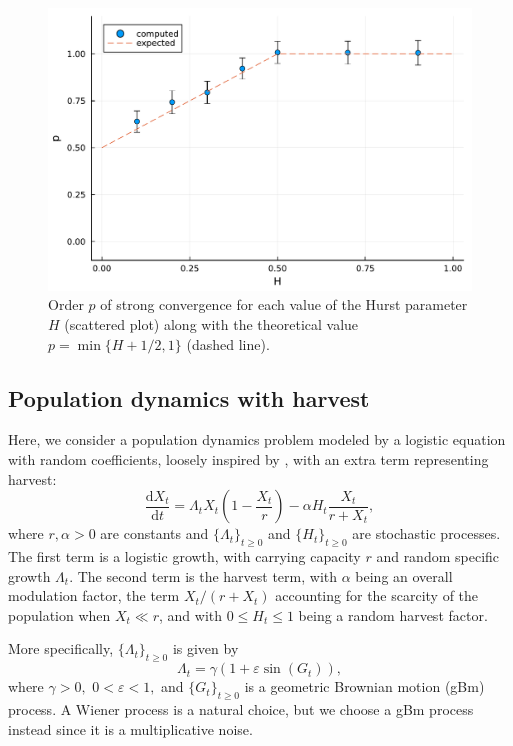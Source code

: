 \documentclass[reqno,12pt]{amsart}
\theoremstyle{plain} %
\theoremstyle{definition} %
\begin{document}
\begin{figure}[htb]
    \includegraphics[scale=0.6]{img/order_dep_on_H_fBm.pdf}
    \caption{Order $p$ of strong convergence for each value of the Hurst parameter $H$ (scattered plot) along with the theoretical value $p=\min\{H + 1/2, 1\}$ (dashed line).}
    \label{figorderdepHfBm}
\end{figure}

\subsection{Population dynamics with harvest}
\label{secpopdyn}

Here, we consider a population dynamics problem modeled by a logistic equation with random coefficients, loosely inspired by \cite[Section 15.2]{HanKloeden2017}, with an extra term representing harvest:
\begin{equation}
    \label{rodepopulationdynamics}
    \frac{\mathrm{d}X_t}{\mathrm{d}t} = \Lambda_t X_t (1 - \frac{X_t}{r}) - \alpha H_t \frac{X_t}{r + X_t},
\end{equation}
where $r, \alpha > 0$ are constants and $\{\Lambda_t\}_{t \geq 0}$ and $\{H_t\}_{t \geq 0}$ are stochastic processes. The first term is a logistic growth, with carrying capacity $r$ and random specific growth $\Lambda_t$. The second term is the harvest term, with $\alpha$ being an overall modulation factor, the term $X_t / (r + X_t)$ accounting for the scarcity of the population when $X_t \ll r$, and with $0 \leq H_t \leq 1$ being a random harvest factor. 

More specifically, $\{\Lambda_t\}_{t \geq 0}$ is given by
\[
    \Lambda_t = \gamma (1 + \varepsilon \sin(G_t)),
\]
where $\gamma > 0,$ $0 < \varepsilon < 1,$ and $\{G_t\}_{t\geq 0}$ is a geometric Brownian motion (gBm) process. A Wiener process is a natural choice, but we choose a gBm process instead since it is a multiplicative noise.
\end{document}

